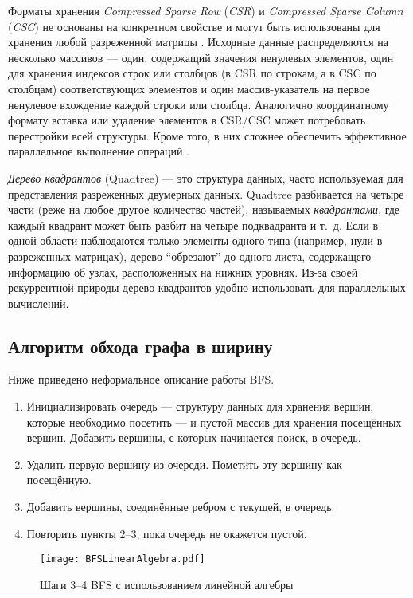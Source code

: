 Форматы хранения \textit{Compressed Sparse Row} (\textit{CSR}) и \textit{Compressed Spar\-se Column} (\textit{CSC}) не основаны на конкретном свойстве
и могут быть использованы для хранения любой разреженной матрицы \cite{stanimirovic2009performance}. Исходные данные распределяются на несколько массивов --- один, содержащий значения ненулевых элементов, один для хранения индексов строк или столбцов (в CSR по строкам, а в CSC по столбцам) соответствующих элементов и один массив-указатель на первое ненулевое вхождение каждой строки или столбца. Аналогично координатному формату вставка или удаление элементов в CSR/CSC может потребовать перестройки всей структуры. Кроме того, в них сложнее обеспечить эффективное параллельное выполнение операций \cite{bulucc2009parallel}.

\textit{Дерево квадрантов} (Quadtree) --- это структура данных, часто используемая для представления разреженных двумерных данных. Quad\-tree разбивается на четыре части (реже на любое другое количество частей), называемых \textit{квадрантами}, где каждый квадрант может быть разбит на четыре подквадранта и т.~д. Если в одной области наблюдаются только элементы одного типа (например, нули в разреженных матрицах), дерево \enquote{обрезают} до одного листа, содержащего информацию об узлах, расположенных на нижних уровнях. Из-за своей рекуррентной природы дерево квадрантов удобно использовать для параллельных вычислений.

\subsection{Алгоритм обхода графа в ширину}

Ниже приведено неформальное описание работы BFS.

\begin{enumerate}
    \item Инициализировать очередь --- структуру данных для хранения вершин, которые необходимо посетить --- и пустой массив для хранения посещённых вершин. Добавить вершины, с которых начинается поиск, в очередь.
    \item Удалить первую вершину из очереди. Пометить эту вершину как посещённую.
    \item Добавить вершины, соединённые ребром с текущей, в очередь.
    \item Повторить пункты 2--3, пока очередь не окажется пустой.
\end{enumerate}

\begin{figure}
    \centering
    \texttt{[image: BFSLinearAlgebra.pdf]}
    \caption{Шаги 3--4 BFS с использованием линейной алгебры}
    \label{fig:bfs}
\end{figure}

